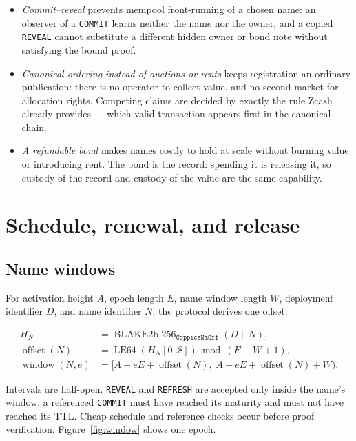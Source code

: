 \documentclass[11pt]{article}
\newcommand{\operation}[1]{\texttt{#1}}
\begin{document}
\begin{itemize}
\item \emph{Commit--reveal} prevents mempool front-running of a chosen name:
an observer of a \operation{COMMIT} learns neither the name nor the owner,
and a copied \operation{REVEAL} cannot substitute a different hidden owner or
bond note without satisfying the bound proof.
\item \emph{Canonical ordering instead of auctions or rents} keeps
registration an ordinary publication: there is no operator to collect value,
and no second market for allocation rights. Competing claims are decided by
exactly the rule Zcash already provides --- which valid transaction appears
first in the canonical chain.
\item \emph{A refundable bond} makes names costly to hold at scale without
burning value or introducing rent. The bond is the record: spending it is
releasing it, so custody of the record and custody of the value are the same
capability.
\end{itemize}

\section{Schedule, renewal, and release}
\label{sec:schedule}

\subsection{Name windows}

For activation height $A$, epoch length $E$, name window length $W$,
deployment identifier $D$, and name identifier $N$, the protocol derives one
offset:

\begin{align*}
H_N &= \operatorname{BLAKE2b\mbox{-}256}_{\texttt{CoppiceNmOff}}
       (D \parallel N), \\
\operatorname{offset}(N) &=
  \operatorname{LE64}(H_N[0..8]) \bmod (E-W+1), \\
\operatorname{window}(N,e) &=
  [A + eE + \operatorname{offset}(N),\;
    A + eE + \operatorname{offset}(N) + W).
\end{align*}

Intervals are half-open. \operation{REVEAL} and \operation{REFRESH} are
accepted only inside the name's window; a referenced \operation{COMMIT} must
have reached its maturity and must not have reached its TTL. Cheap schedule
and reference checks occur before proof verification.
Figure~\ref{fig:window} shows one epoch.
\end{document}
